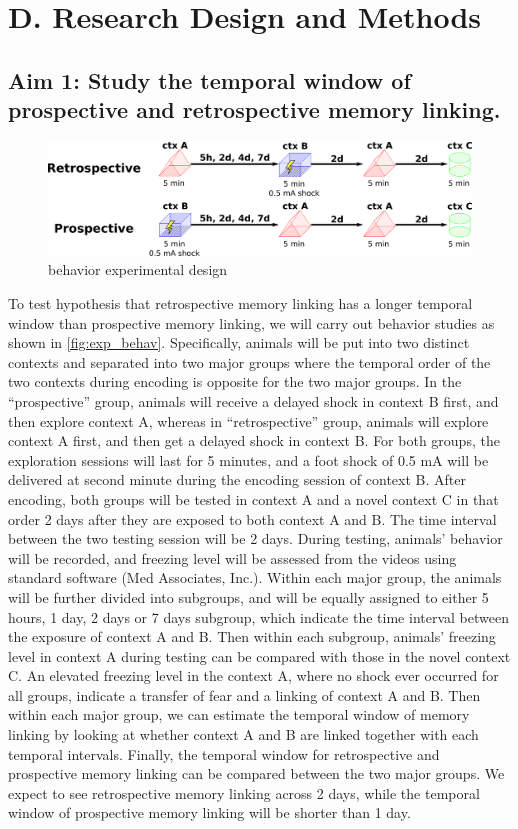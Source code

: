 \documentclass[master.tex]{subfiles}
\begin{document}
\section*{D. Research Design and Methods}

\subsection*{Aim 1: Study the temporal window of prospective and retrospective
  memory linking.}

\begin{figure}[!hbt]
  \centering \includegraphics[scale = .135]{Figures/exp_pro_retro.pdf}
  \caption{\footnotesize behavior experimental design}
  \label{fig:exp_behav}
\end{figure}

To test hypothesis that retrospective memory linking has a longer temporal
window than prospective memory linking, we will carry out behavior studies as
shown in \autoref{fig:exp_behav}. Specifically, animals will be put into two
distinct contexts and separated into two major groups where the temporal order
of the two contexts during encoding is opposite for the two major groups. In the
``prospective'' group, animals will receive a delayed shock in context B first,
and then explore context A, whereas in ``retrospective'' group, animals will
explore context A first, and then get a delayed shock in context B. For both
groups, the exploration sessions will last for 5 minutes, and a foot shock of
0.5 mA will be delivered at second minute during the encoding session of context
B. After encoding, both groups will be tested in context A and a novel context C
in that order 2 days after they are exposed to both context A and B. The time
interval between the two testing session will be 2 days. During testing,
animals' behavior will be recorded, and freezing level will be assessed from the
videos using standard software (Med Associates, Inc.). Within each major group,
the animals will be further divided into subgroups, and will be equally assigned
to either 5 hours, 1 day, 2 days or 7 days subgroup, which indicate the time
interval between the exposure of context A and B. Then within each subgroup,
animals' freezing level in context A during testing can be compared with those
in the novel context C. An elevated freezing level in the context A, where no
shock ever occurred for all groups, indicate a transfer of fear and a linking of
context A and B. Then within each major group, we can estimate the temporal
window of memory linking by looking at whether context A and B are linked
together with each temporal intervals. Finally, the temporal window for
retrospective and prospective memory linking can be compared between the two
major groups. We expect to see retrospective memory linking across 2 days, while
the temporal window of prospective memory linking will be shorter than 1 day.
\end{document}
